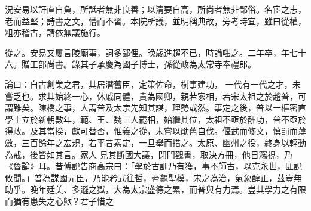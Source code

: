 \begin{pinyinscope}
 況安易以訐直自負，所詆者無非良善；以清要自高，所尚者無非鄙俗。名宦之志，老而益堅；詩書之文，懵而不習。本院所議，並明稱典故，旁考時宜，雖曰從權，粗亦稽古，請依無議施行。



 從之。安易又屢言陵廟事，詞多鄙俚。晚歲進趨不已，時論嗤之。二年卒，年七十六。贈工部尚書。錄其子承慶為國子博士，孫從政為太常寺奉禮郎。



 論曰：自古創業之君，其居潛舊臣，定策佐命，樹事建功，
 一代有一代之才，未嘗乏也。求其始終一心，休戚同體，貴為國卿，親若家相，若宋太祖之於趙普，可謂難矣。陳橋之事，人謂普及太宗先知其謀，理勢或然。事定之後，普以一樞密直學士立於新朝數年，範、王、魏三人罷相，始繼其位，太祖不亟於酬功，普不亟於得政。及其當揆，獻可替否，惟義之從，未嘗以勛舊自伐。偃武而修文，慎罰而薄斂，三百餘年之宏規，若平昔素定，一旦舉而措之。太原、幽州之役，終身以輕動為戒，後皆如其言。家人
 見其斷國大議，閉門觀書，取決方冊，他日竊視，乃《魯論》耳。昔傅說告商高宗曰：「學於古訓乃有獲，事不師古，以克永世，匪說攸聞。」普為謀國元臣，乃能矜式往哲，蓍龜聖模，宋之為治，氣象醇正，茲豈無助乎。晚年廷美、多遜之獄，大為太宗盛德之累，而普與有力焉。豈其學力之有限而猶有患失之心歟？君子惜之



\end{pinyinscope}